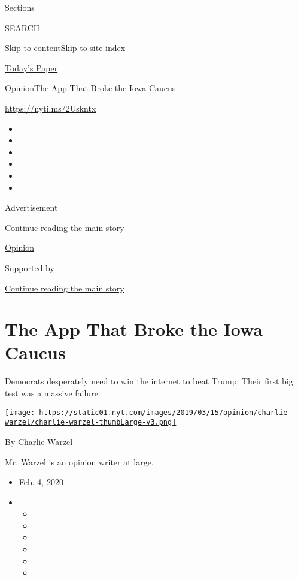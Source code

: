 Sections

SEARCH

\protect\hyperlink{site-content}{Skip to
content}\protect\hyperlink{site-index}{Skip to site index}

\href{https://myaccount.nytimes.com/auth/login?response_type=cookie\&client_id=vi}{}

\href{https://www.nytimes.com/section/todayspaper}{Today's Paper}

\href{/section/opinion}{Opinion}\textbar{}The App That Broke the Iowa
Caucus

\url{https://nyti.ms/2Uskntx}

\begin{itemize}
\item
\item
\item
\item
\item
\item
\end{itemize}

Advertisement

\protect\hyperlink{after-top}{Continue reading the main story}

\href{/section/opinion}{Opinion}

Supported by

\protect\hyperlink{after-sponsor}{Continue reading the main story}

\hypertarget{the-app-that-broke-the-iowa-caucus}{%
\section{The App That Broke the Iowa
Caucus}\label{the-app-that-broke-the-iowa-caucus}}

Democrats desperately need to win the internet to beat Trump. Their
first big test was a massive failure.

\href{https://www.nytimes.com/by/charlie-warzel}{\texttt{[image: https://static01.nyt.com/images/2019/03/15/opinion/charlie-warzel/charlie-warzel-thumbLarge-v3.png]}}

By \href{https://www.nytimes.com/by/charlie-warzel}{Charlie Warzel}

Mr. Warzel is an opinion writer at large.

\begin{itemize}
\item
  Feb. 4, 2020
\item
  \begin{itemize}
  \item
  \item
  \item
  \item
  \item
  \item
  \end{itemize}
\end{itemize}

